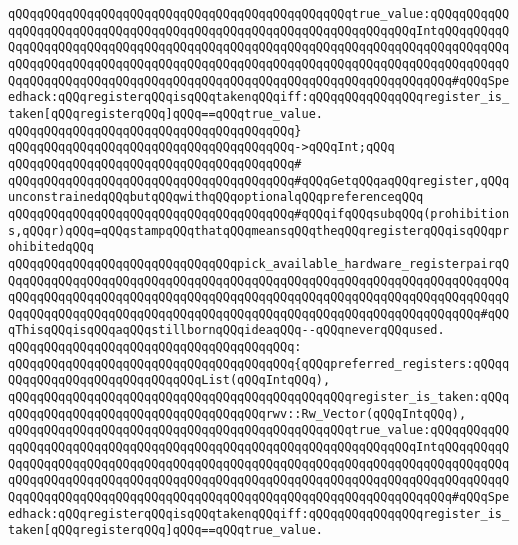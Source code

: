 \verb|qQQqqQQqqQQqqQQqqQQqqQQqqQQqqQQqqQQqqQQqqQQqqQQqtrue_value:qQQqqQQqqQQqqQQqqQQqqQQqqQQqqQQqqQQqqQQqqQQqqQQqqQQqqQQqqQQqqQQqqQQqIntqQQqqQQqqQQqqQQqqQQqqQQqqQQqqQQqqQQqqQQqqQQqqQQqqQQqqQQqqQQqqQQqqQQqqQQqqQQqqQQqqQQqqQQqqQQqqQQqqQQqqQQqqQQqqQQqqQQqqQQqqQQqqQQqqQQqqQQqqQQqqQQqqQQqqQQqqQQqqQQqqQQqqQQqqQQqqQQqqQQqqQQqqQQqqQQqqQQqqQQqqQQqqQQqqQQq#qQQqSpeedhack:qQQqregisterqQQqisqQQqtakenqQQqiff:qQQqqQQqqQQqqQQqregister_is_taken[qQQqregisterqQQq]qQQq==qQQqtrue_value.|\newline
\verb|qQQqqQQqqQQqqQQqqQQqqQQqqQQqqQQqqQQqqQQq}|\newline
\verb|qQQqqQQqqQQqqQQqqQQqqQQqqQQqqQQqqQQqqQQq->qQQqInt;qQQq|\newline
\verb|qQQqqQQqqQQqqQQqqQQqqQQqqQQqqQQqqQQqqQQq#|\newline
\verb|qQQqqQQqqQQqqQQqqQQqqQQqqQQqqQQqqQQqqQQq#qQQqGetqQQqaqQQqregister,qQQqunconstrainedqQQqbutqQQqwithqQQqoptionalqQQqpreferenceqQQq|\newline
\verb|qQQqqQQqqQQqqQQqqQQqqQQqqQQqqQQqqQQqqQQq#qQQqifqQQqsubqQQq(prohibitions,qQQqr)qQQq=qQQqstampqQQqthatqQQqmeansqQQqtheqQQqregisterqQQqisqQQqprohibitedqQQq|\newline
\newline
\newline
\verb|qQQqqQQqqQQqqQQqqQQqqQQqqQQqqQQqpick_available_hardware_registerpairqQQqqQQqqQQqqQQqqQQqqQQqqQQqqQQqqQQqqQQqqQQqqQQqqQQqqQQqqQQqqQQqqQQqqQQqqQQqqQQqqQQqqQQqqQQqqQQqqQQqqQQqqQQqqQQqqQQqqQQqqQQqqQQqqQQqqQQqqQQqqQQqqQQqqQQqqQQqqQQqqQQqqQQqqQQqqQQqqQQqqQQqqQQqqQQqqQQqqQQqqQQqqQQq#qQQqThisqQQqisqQQqaqQQqstillbornqQQqideaqQQq--qQQqneverqQQqused.|\newline
\verb|qQQqqQQqqQQqqQQqqQQqqQQqqQQqqQQqqQQqqQQq:|\newline
\verb|qQQqqQQqqQQqqQQqqQQqqQQqqQQqqQQqqQQqqQQq{qQQqpreferred_registers:qQQqqQQqqQQqqQQqqQQqqQQqqQQqqQQqList(qQQqIntqQQq),|\newline
\verb|qQQqqQQqqQQqqQQqqQQqqQQqqQQqqQQqqQQqqQQqqQQqqQQqregister_is_taken:qQQqqQQqqQQqqQQqqQQqqQQqqQQqqQQqqQQqqQQqrwv::Rw_Vector(qQQqIntqQQq),|\newline
\verb|qQQqqQQqqQQqqQQqqQQqqQQqqQQqqQQqqQQqqQQqqQQqqQQqtrue_value:qQQqqQQqqQQqqQQqqQQqqQQqqQQqqQQqqQQqqQQqqQQqqQQqqQQqqQQqqQQqqQQqqQQqIntqQQqqQQqqQQqqQQqqQQqqQQqqQQqqQQqqQQqqQQqqQQqqQQqqQQqqQQqqQQqqQQqqQQqqQQqqQQqqQQqqQQqqQQqqQQqqQQqqQQqqQQqqQQqqQQqqQQqqQQqqQQqqQQqqQQqqQQqqQQqqQQqqQQqqQQqqQQqqQQqqQQqqQQqqQQqqQQqqQQqqQQqqQQqqQQqqQQqqQQqqQQqqQQqqQQq#qQQqSpeedhack:qQQqregisterqQQqisqQQqtakenqQQqiff:qQQqqQQqqQQqqQQqregister_is_taken[qQQqregisterqQQq]qQQq==qQQqtrue_value.|\newline
